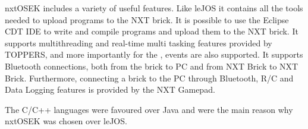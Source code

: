 nxtOSEK includes a variety of useful features. Like leJOS it contains all the tools needed to upload programs to the NXT brick. It is possible to use the Eclipse CDT IDE to write and compile programs and upload them to the NXT brick. It supports multithreading and real-time multi tasking features provided by TOPPERS, and more importantly for the \projname{}, events are also supported. It supports Bluetooth connections, both from the brick to PC and from NXT Brick to NXT Brick. Furthermore, connecting a brick to the PC through Bluetooth, R/C and Data Logging features is provided by the NXT Gamepad.

The C/C++ languages were favoured over Java and were the main reason why nxtOSEK was chosen over leJOS.












